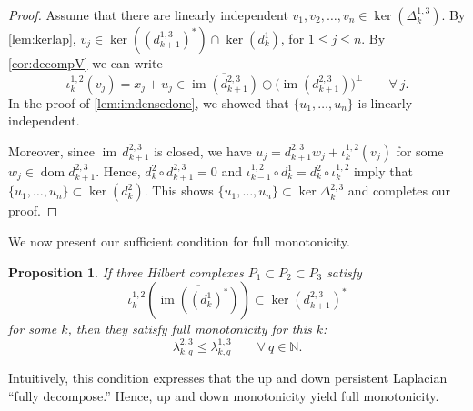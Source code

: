 \documentclass[11pt]{article}
\newtheorem{prop}[theorem]{Proposition}
\theoremstyle{definition}
\theoremstyle{remark}
\DeclareMathOperator\dom{dom}
\DeclareMathOperator{\im}{im}
\newcommand{\N}{\mathbb{N}}
\begin{document}
    \begin{proof}
        Assume that there are linearly independent
        $v_1,v_2,\dots,v_n \in \ker(\Delta^{1,3}_k)$. By \cref{lem:kerlap}, $v_j\in \ker((d^{1,3}_{k+1})^*)\cap\ker(d^1_k)$, for $1\leq j\leq n$. By \cref{cor:decompV} we can write 
        $$
        \iota_k^{1,2}(v_j)=x_j + u_j \in \overline{\im(d_{k+1}^{2,3})} \oplus \big(\im(d_{k+1}^{2,3})\big)^\perp \qquad \forall\ j.
        $$
        In the proof of \cref{lem:imdensedone}, we showed that $\{u_1,\dots,u_n\}$ is linearly independent.
        
        Moreover, since $\im \, d_{k+1}^{2,3}$ is closed, we have $u_j=d^{2,3}_{k+1}w_j+\iota_k^{1,2}(v_j)$ for some $w_j\in \dom d^{2,3}_{k+1}$. Hence, $d^2_k\circ d^{2,3}_{k+1}=0$ and $\iota_{k-1}^{1,2} \circ d^1_k= d^2_k \circ \iota_k^{1,2}$ imply that $\{u_1,\dots,u_n\}\subset \ker(d^2_k)$. This shows $\{u_1,\dots,u_n\}\subset \ker \Delta_k^{2,3}$ and completes our proof.
\end{proof}

We now present our sufficient condition for full monotonicity.
\begin{prop}\label{prop:fmdecompose}
    If three Hilbert complexes $P_1 \subset P_2 \subset P_3$ satisfy 
    $$
        \iota_k^{1,2} \left(\overline{\im((d_k^1)^*)}\right) \subset \ker(d_{k+1}^{2,3})^*
    $$
    for some $k$, then they satisfy full monotonicity for this $k$:
    $$
    \lambda_{k,q}^{2,3} \le \lambda^{1,3}_{k,q} \qquad \forall\ q \in \N.
    $$
\end{prop}

Intuitively, this condition expresses that the up and down persistent Laplacian ``fully decompose.'' Hence, up and down monotonicity yield full monotonicity. 
\end{document}
